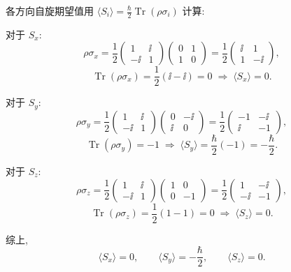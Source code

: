 \begin{solution}
各方向自旋期望值用 $\langle S_i\rangle = \frac{\hbar}{2}\operatorname{Tr}(\rho\sigma_i)$ 计算:

对于 $S_x$:
\[
\rho\sigma_x = \frac{1}{2}\begin{pmatrix}1&\ii\\-\ii&1\end{pmatrix}\begin{pmatrix}0&1\\1&0\end{pmatrix}
= \frac{1}{2}\begin{pmatrix}\ii&1\\1&-\ii\end{pmatrix},
\]
\[
\operatorname{Tr}(\rho\sigma_x) = \frac{1}{2}(\ii - \ii) = 0
\;\Longrightarrow\; \langle S_x\rangle = 0.
\]

对于 $S_y$:
\[
\rho\sigma_y = \frac{1}{2}\begin{pmatrix}1&\ii\\-\ii&1\end{pmatrix}\begin{pmatrix}0&-\ii\\\ii&0\end{pmatrix}
= \frac{1}{2}\begin{pmatrix}-1&-\ii\\\ii&-1\end{pmatrix},
\]
\[
\operatorname{Tr}(\rho\sigma_y) = -1
\;\Longrightarrow\; \langle S_y\rangle = \frac{\hbar}{2}(-1) = -\frac{\hbar}{2}.
\]

对于 $S_z$:
\[
\rho\sigma_z = \frac{1}{2}\begin{pmatrix}1&\ii\\-\ii&1\end{pmatrix}\begin{pmatrix}1&0\\0&-1\end{pmatrix}
= \frac{1}{2}\begin{pmatrix}1&-\ii\\-\ii&-1\end{pmatrix},
\]
\[
\operatorname{Tr}(\rho\sigma_z) = \frac{1}{2}(1-1) = 0
\;\Longrightarrow\; \langle S_z\rangle = 0.
\]

综上,
\[
\boxed{\langle S_x\rangle = 0,\qquad \langle S_y\rangle = -\frac{\hbar}{2},\qquad \langle S_z\rangle = 0.}
\]


\end{solution}
